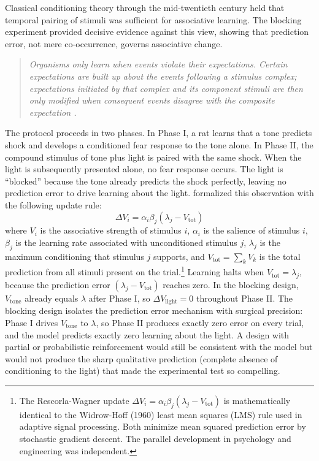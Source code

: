 Classical conditioning theory through the mid-twentieth century held that temporal pairing of stimuli was sufficient for associative learning. The blocking experiment provided decisive evidence against this view, showing that prediction error, not mere co-occurrence, governs associative change.

\begin{quote}\itshape
Organisms only learn when events violate their expectations. Certain expectations are built up about the events following a stimulus complex; expectations initiated by that complex and its component stimuli are then only modified when consequent events disagree with the composite expectation \citep{RescorlaWagner1972}.
\end{quote}

The protocol proceeds in two phases. In Phase I, a rat learns that a tone predicts shock and develops a conditioned fear response to the tone alone. In Phase II, the compound stimulus of tone plus light is paired with the same shock. When the light is subsequently presented alone, no fear response occurs. The light is ``blocked'' because the tone already predicts the shock perfectly, leaving no prediction error to drive learning about the light. \citet{RescorlaWagner1972} formalized this observation with the following update rule:
\begin{equation}
\Delta V_i = \alpha_i \beta_j (\lambda_j - V_{\text{tot}})
\end{equation}
where $V_i$ is the associative strength of stimulus $i$, $\alpha_i$ is the salience of stimulus $i$, $\beta_j$ is the learning rate associated with unconditioned stimulus $j$, $\lambda_j$ is the maximum conditioning that stimulus $j$ supports, and $V_{\text{tot}} = \sum_k V_k$ is the total prediction from all stimuli present on the trial.\footnote{The Rescorla-Wagner update $\Delta V_i = \alpha_i \beta_j (\lambda_j - V_{\text{tot}})$ is mathematically identical to the Widrow-Hoff (1960) least mean squares (LMS) rule used in adaptive signal processing. Both minimize mean squared prediction error by stochastic gradient descent. The parallel development in psychology and engineering was independent.} Learning halts when $V_{\text{tot}} = \lambda_j$, because the prediction error $(\lambda_j - V_{\text{tot}})$ reaches zero. In the blocking design, $V_{\text{tone}}$ already equals $\lambda$ after Phase I, so $\Delta V_{\text{light}} = 0$ throughout Phase II. The blocking design isolates the prediction error mechanism with surgical precision: Phase I drives $V_{\text{tone}}$ to $\lambda$, so Phase II produces exactly zero error on every trial, and the model predicts exactly zero learning about the light. A design with partial or probabilistic reinforcement would still be consistent with the model but would not produce the sharp qualitative prediction (complete absence of conditioning to the light) that made the experimental test so compelling.

